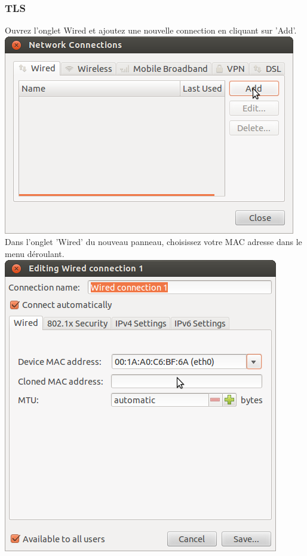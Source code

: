 \subsubsection{TLS}
Ouvrez l'onglet Wired et ajoutez une nouvelle connection en cliquant sur 'Add'.\\
\includegraphics[width=\screenShotSize{}]{img/wiredAdd.png}\\
Dans l'onglet 'Wired' du nouveau panneau, choisissez votre MAC adresse dans le menu déroulant.\\
\includegraphics[width=\screenShotSize{}]{img/setMac.png}\\

